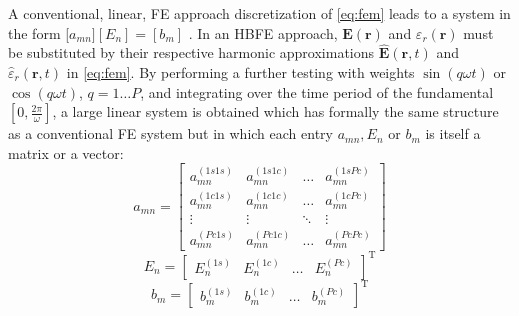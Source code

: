 \documentclass[journal]{IEEEtran}
\renewcommand{\vec}[1]{\mathbf{#1}}
\begin{document}
A conventional, linear, FE approach discretization of \eqref{eq:fem} 
leads to a system in the form [$a_{mn}][E_n] = [b_m]$ \cite{Pelosi2009}.
In an HBFE approach, $\vec{E}(\vec{r})$ and
${\varepsilon}_r(\vec{r})$ must be substituted by their respective harmonic approximations $\vec{\hat{E}}(\vec{r}, t)$ and $\hat{{\varepsilon}}_r(\vec{r}, t)$ in \eqref{eq:fem}.  By performing
a further testing with weights $\sin(q \omega t)$ or
$\cos(q \omega t)$, $q = 1 \dots P$, and integrating over the time period of the fundamental $\left [
0,\frac{2\pi}{\omega} \right ]$,  a large linear system is
obtained which has formally the same structure as 
a conventional FE system but in which each entry $a_{mn}, E_n$ or $b_m$
is itself a matrix or a vector:
%
\begin{equation}\label{e:HBfemmn}
a_{mn}=
\begin{bmatrix}
a_{mn}^{(1s1s)} & a_{mn}^{(1s1c)} & \ldots &  a_{mn}^{(1sPc)} \\
a_{mn}^{(1c1s)} & a_{mn}^{(1c1c)} & \ldots &  a_{mn}^{(1cPc)} \\
\vdots & \vdots & \ddots & \vdots \\
a_{mn}^{(Pc1s)} & a_{mn}^{(Pc1c)} & \ldots &  a_{mn}^{(PcPc)}
\end{bmatrix}
\end{equation}
\begin{equation} 
E_n = 
\begin{bmatrix}
E_{n}^{(1s)} &
E_{n}^{(1c)} &
\ldots &
E_{n}^{(Pc)}
\end{bmatrix}^\text{T}
\end{equation}
\begin{equation}
b_m = 
\begin{bmatrix}
b_{m}^{(1s)} &
b_{m}^{(1c)} &
\ldots &
b_{m}^{(Pc)}
\end{bmatrix}^\text{T}
\end{equation}
\end{document}
